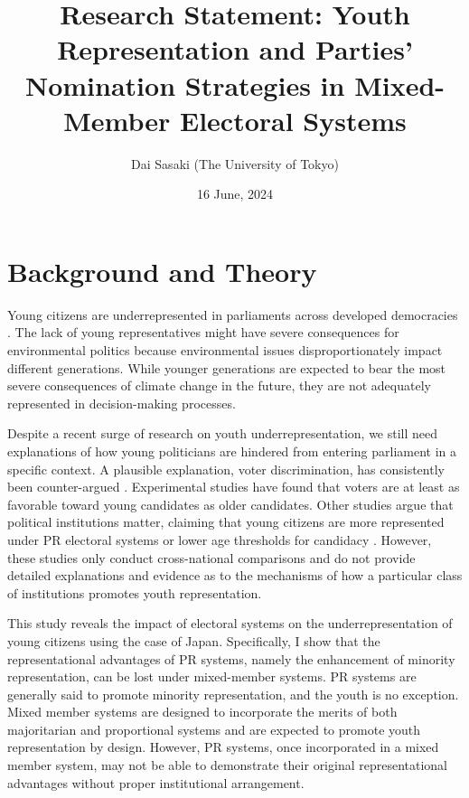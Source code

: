 \documentclass[a4paper, 12pt]{article}
\title{
	Research Statement: Youth Representation and Parties' Nomination Strategies in Mixed-Member Electoral Systems
}
\author{Dai Sasaki (The University of Tokyo)}
\date{16 June, 2024}
\begin{document}
\maketitle

\newpage

\section{Background and Theory}

Young citizens are underrepresented in parliaments across developed democracies \citep{stockemer2018age, stockemer_introducing_2022, stockemer_youth_2022, stockemer_age_2023, stockemer2023young}. The lack of young representatives might have severe consequences for environmental politics because environmental issues disproportionately impact different generations. While younger generations are expected to bear the most severe consequences of climate change in the future, they are not adequately represented in decision-making processes. 

Despite a recent surge of research on youth underrepresentation, we still need explanations of how young politicians are hindered from entering parliament in a specific context. A plausible explanation, voter discrimination, has consistently been counter-argued \citep{eshima2022just, horiuchi2020identifying, mcclean2022too}. Experimental studies have found that voters are at least as favorable toward young candidates as older candidates. Other studies argue that political institutions matter, claiming that young citizens are more represented under PR electoral systems or lower age thresholds for candidacy \citep{joshi2013representation, stockemer2018age}. However, these studies only conduct cross-national comparisons and do not provide detailed explanations and evidence as to the mechanisms of how a particular class of institutions promotes youth representation. 

This study reveals the impact of electoral systems on the underrepresentation of young citizens using the case of Japan. Specifically, I show that the representational advantages of PR systems, namely the enhancement of minority representation, can be lost under mixed-member systems. PR systems are generally said to promote minority representation, and the youth is no exception. Mixed member systems are designed to incorporate the merits of both majoritarian and proportional systems and are expected to promote youth representation by design. However, PR systems, once incorporated in a mixed member system, may not be able to demonstrate their original representational advantages without proper institutional arrangement. 
\end{document}
